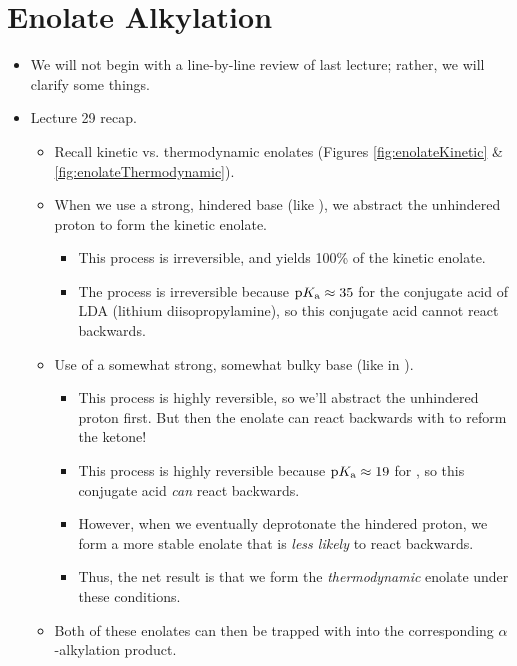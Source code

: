\documentclass[../notes.tex]{subfiles}
\begin{document}
\section{Enolate Alkylation}
\begin{itemize}
    \item {}We will not begin with a line-by-line review of last lecture; rather, we will clarify some things.
    \item Lecture 29 recap.
    \begin{itemize}
        \item Recall kinetic vs. thermodynamic enolates (Figures \ref{fig:enolateKinetic} \& \ref{fig:enolateThermodynamic}).
        \item When we use a strong, hindered base (like ), we abstract the unhindered proton to form the kinetic enolate.
        \begin{itemize}
            \item This process is irreversible, and yields 100\% of the kinetic enolate.
            \item The process is irreversible because $\textup{p}K_\textup{a}\approx 35$ for the conjugate acid of LDA (lithium diisopropylamine), so this conjugate acid cannot react backwards.
        \end{itemize}
        \item Use of a somewhat strong, somewhat bulky base (like  in ).
        \begin{itemize}
            \item This process is highly reversible, so we'll abstract the unhindered proton first. But then the enolate can react backwards with  to reform the ketone!
            \item This process is highly reversible because $\textup{p}K_\textup{a}\approx 19$ for , so this conjugate acid \emph{can} react backwards.
            \item However, when we eventually deprotonate the hindered proton, we form a more stable enolate that is \emph{less likely} to react backwards.
            \item Thus, the net result is that we form the \emph{thermodynamic} enolate under these conditions.
        \end{itemize}
        \item Both of these enolates can then be trapped with  into the corresponding $\alpha$-alkylation product.
    \end{itemize}

\end{itemize}
\end{document}
